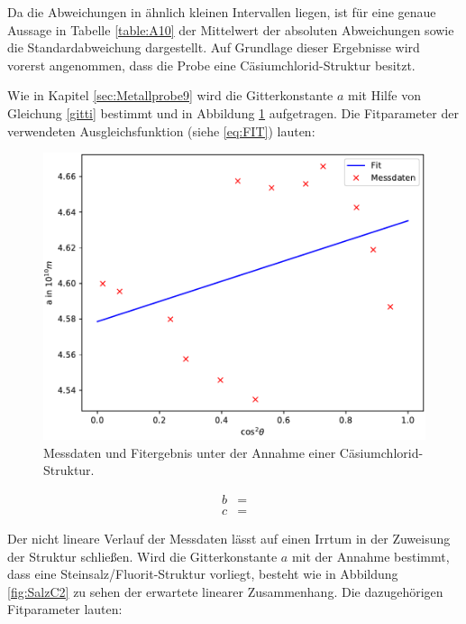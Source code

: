 

Da die Abweichungen in ähnlich kleinen Intervallen liegen, ist für eine genaue Aussage in Tabelle \ref{table:A10} der Mittelwert der absoluten Abweichungen sowie die Standardabweichung dargestellt. Auf Grundlage dieser Ergebnisse wird vorerst angenommen, dass die Probe eine Cäsiumchlorid-Struktur besitzt. 



Wie in Kapitel \ref{sec:Metallprobe9} wird die Gitterkonstante $a$ mit Hilfe von Gleichung \eqref{gitti} bestimmt und in Abbildung \ref{fig:SalzC} aufgetragen. Die Fitparameter der verwendeten Ausgleichsfunktion (siehe \ref{eq:FIT}) lauten:


\begin{figure}
  \centering
  \includegraphics[scale=0.75]{build/Salz_2.pdf}
  \caption{Messdaten und Fitergebnis unter der Annahme einer Cäsiumchlorid-Struktur.}
  \label{fig:SalzC}
\end{figure}


\begin{align}
	b&=  \\
	c&= 
\end{align}

Der nicht lineare Verlauf der Messdaten lässt auf einen Irrtum in der Zuweisung der Struktur schließen. Wird die Gitterkonstante $a$ mit der Annahme bestimmt, dass eine Steinsalz/Fluorit-Struktur vorliegt, besteht wie in Abbildung \ref{fig:SalzC2} zu sehen der erwartete linearer Zusammenhang. Die dazugehörigen Fitparameter lauten:


